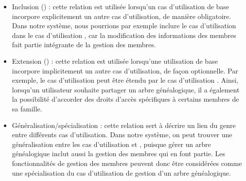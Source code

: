 \begin{itemize}

  \item Inclusion () : cette relation est utilisée lorsqu’un cas
    d’utilisation de base incorpore explicitement un autre cas d’utilisation,
    de manière obligatoire. Dans notre système, nous pourrions par exemple
    inclure le cas d’utilisation 
    dans le cas d’utilisation , car la modification des
    informations des membres fait partie intégrante de la gestion des membres.

  \item Extension () : cette relation est utilisée lorsqu’une
    utilisation de base incorpore implicitement un autre cas d’utilisation, de
    façon optionnelle. Par exemple, le cas d’utilisation 
    peut être étendu par le cas d’utilisation .
    Ainsi, lorsqu’un utilisateur souhaite partager un arbre généalogique, il a
    également la possibilité d’accorder des droits d’accès spécifiques à
    certains membres de sa famille.

  \item Généralisation/spécialisation : cette relation sert à décrire un lien
    du genre  entre différents cas d’utilisation. Dans notre système,
    on peut trouver une généralisation entre les cas d’utilisation  et , puisque gérer un arbre
    généalogique inclut aussi la gestion des membres qui en font partie. Les
    fonctionnalités de gestion des membres peuvent donc être considérées comme
    une spécialisation du cas d’utilisation de gestion d’un arbre généalogique.

\end{itemize}


